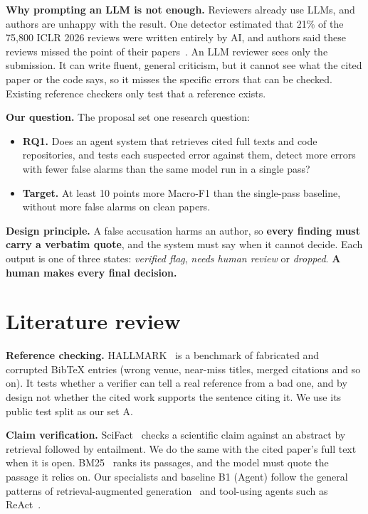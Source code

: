 \documentclass[11pt,a4paper]{article}
\begin{document}
\textbf{Why prompting an LLM is not enough.} Reviewers already use LLMs, and authors are unhappy
with the result. One detector estimated that 21\% of the 75,800 ICLR 2026 reviews were written
entirely by AI, and authors said these reviews missed the point of their
papers~\cite{nature-iclr}. An LLM reviewer sees only the submission. It can write fluent, general
criticism, but it cannot see what the cited paper or the code says, so it misses the specific
errors that can be checked. Existing reference checkers only test that a reference exists.

\textbf{Our question.} The proposal set one research question:
\begin{itemize}
\item \textbf{RQ1.} Does an agent system that retrieves cited full texts and code repositories, and
tests each suspected error against them, detect more errors with fewer false alarms than the same
model run in a single pass?
\item \textbf{Target.} At least 10 points more Macro-F1 than the single-pass baseline, without more
false alarms on clean papers.
\end{itemize}

\textbf{Design principle.} A false accusation harms an author, so \textbf{every finding must carry a
verbatim quote}, and the system must say when it cannot decide. Each output is one of three states:
\emph{verified flag}, \emph{needs human review} or \emph{dropped}. \textbf{A human makes every final
decision.}

\section{Literature review}
\textbf{Reference checking.} HALLMARK~\cite{hallmark} is a benchmark of fabricated and corrupted
BibTeX entries (wrong venue, near-miss titles, merged citations and so on). It tests whether a
verifier can tell a real reference from a bad one, and by design not whether the cited work
supports the sentence citing it. We use its public test split as our set A.

\textbf{Claim verification.} SciFact~\cite{scifact} checks a scientific claim against an abstract
by retrieval followed by entailment. We do the same with the cited paper's full text when it is
open. BM25~\cite{bm25} ranks its passages, and the model must quote the passage it relies on. Our
specialists and baseline B1 (Agent) follow the general patterns of retrieval-augmented
generation~\cite{rag} and tool-using agents such as ReAct~\cite{react}.
\end{document}
